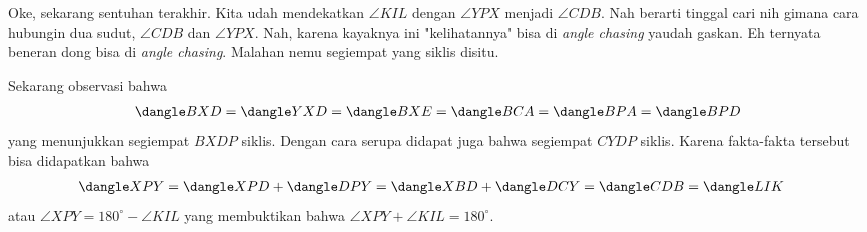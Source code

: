 \begin{komentar*}
    Oke, sekarang sentuhan terakhir. Kita udah mendekatkan $\angle KIL$ dengan $\angle YPX$ menjadi $\angle CDB$. Nah berarti tinggal cari nih gimana cara hubungin dua sudut, $\angle CDB$ dan $\angle YPX$. Nah, karena kayaknya ini "kelihatannya" bisa di \textit{angle chasing} yaudah gaskan. Eh ternyata beneran dong bisa di \textit{angle chasing}. Malahan nemu segiempat yang siklis disitu.
\end{komentar*}
Sekarang observasi bahwa
\begin{align*}
    \dangle BXD = \dangle YXD = \dangle BXE = \dangle BCA = \dangle BPA = \dangle BPD
\end{align*}
yang menunjukkan segiempat $BXDP$ siklis. Dengan cara serupa didapat juga bahwa segiempat $CYDP$ siklis. Karena fakta-fakta tersebut bisa didapatkan bahwa
\begin{align*}
    \dangle XPY &= \dangle XPD + \dangle DPY = \dangle XBD +\dangle DCY = \dangle CDB = \dangle LIK
\end{align*}
atau $\angle XPY = 180^\circ - \angle KIL$ yang membuktikan bahwa $\angle XPY + \angle KIL = 180^\circ$.

\newpage

